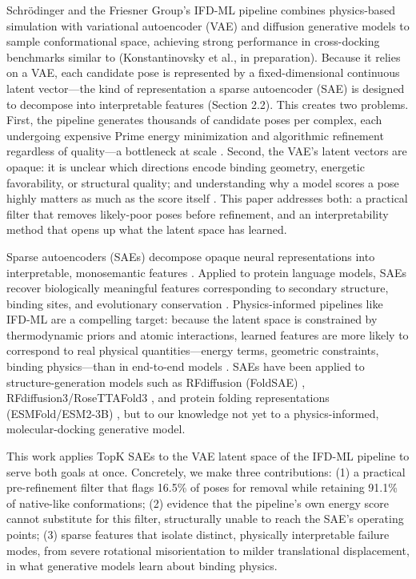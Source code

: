 \documentclass{article}
\begin{document}
Schrödinger and the Friesner Group's IFD-ML pipeline combines physics-based simulation with variational autoencoder (VAE) and diffusion generative models to sample conformational space, achieving strong performance in cross-docking benchmarks similar to \citet{mansoor2024} (Konstantinovsky et al., in preparation). Because it relies on a VAE, each candidate pose is represented by a fixed-dimensional continuous latent vector---the kind of representation a sparse autoencoder (SAE) is designed to decompose into interpretable features (Section 2.2). This creates two problems. First, the pipeline generates thousands of candidate poses per complex, each undergoing expensive Prime energy minimization \citep{li2011} and algorithmic refinement regardless of quality---a bottleneck at scale \citep{wang2019}. Second, the VAE's latent vectors are opaque: it is unclear which directions encode binding geometry, energetic favorability, or structural quality; and understanding why a model scores a pose highly matters as much as the score itself \citep{qadri2025}. This paper addresses both: a practical filter that removes likely-poor poses before refinement, and an interpretability method that opens up what the latent space has learned.

Sparse autoencoders (SAEs) decompose opaque neural representations into interpretable, monosemantic features \citep{templeton2024,gao2024}. Applied to protein language models, SAEs recover biologically meaningful features corresponding to secondary structure, binding sites, and evolutionary conservation \citep{adams2025,simon2025}. Physics-informed pipelines like IFD-ML are a compelling target: because the latent space is constrained by thermodynamic priors and atomic interactions, learned features are more likely to correspond to real physical quantities---energy terms, geometric constraints, binding physics---than in end-to-end models \citep{li2026,wu2024}. SAEs have been applied to structure-generation models such as RFdiffusion (FoldSAE) \citep{zarzecki2025}, RFdiffusion3/RoseTTAFold3 \citep{yu2026}, and protein folding representations (ESMFold/ESM2-3B) \citep{parsan2025}, but to our knowledge not yet to a physics-informed, molecular-docking generative model.

This work applies TopK SAEs to the VAE latent space of the IFD-ML pipeline to serve both goals at once. Concretely, we make three contributions: (1) a practical pre-refinement filter that flags 16.5\% of poses for removal while retaining 91.1\% of native-like conformations; (2) evidence that the pipeline's own energy score cannot substitute for this filter, structurally unable to reach the SAE's operating points; (3) sparse features that isolate distinct, physically interpretable failure modes, from severe rotational misorientation to milder translational displacement, in what generative models learn about binding physics.
\end{document}
